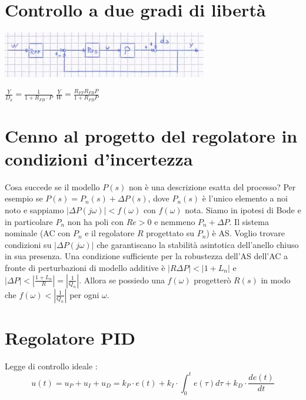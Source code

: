 \begin{landscape}
\begin{multicols*}{2}
    \section{Controllo a due gradi di libertà}
    \begin{center}
        \includegraphics[height=2cm]{../formulario/img5.JPG}
    \end{center}
    $\frac{Y}{D_a} = \frac{1}{1+R_{FB} \cdot P}$\newline
    $\frac{Y}{W} = \frac{R_{FF} R_{FB} P}{1 + R_{FB} P}$
    \section{Cenno al progetto del regolatore in condizioni d'incertezza}
    Cosa succede se il modello $P(s)$ non è una descrizione esatta del processo?\newline
    Per esempio se $P(s) = P_n(s) + \Delta P(s)$, dove $P_n(s)$ è l'unico elemento a noi noto e sappiamo $|\Delta P(j \omega)| < f(\omega)$ con $f(\omega)$ nota. \newline
    Siamo in ipotesi di Bode e in particolare $P_n$ non ha poli con $Re > 0$ e nemmeno $P_n + \Delta P$.\newline
    Il sistema nominale (AC con $P_n$ e il regolatore $R$ progettato su $P_n$) è AS.\newline
    Voglio trovare condizioni su $|\Delta P (j \omega)|$ che garantiscano la stabilità asintotica dell'anello chiuso in sua presenza.\newline
    Una condizione sufficiente per la robustezza dell'AS dell'AC a fronte di perturbazioni di modello additive è $|R \Delta P| < |1 + L_n|$ e $|\Delta P| < | \frac{1 + L_n}{R}| = | \frac{1}{Q_n}|$.\newline
    Allora se possiedo una $f(\omega)$ progetterò $R(s)$ in modo che $f(\omega) < | \frac{1}{Q_n}| $ per ogni $\omega$.
    \newpage\section{Regolatore PID}
    Legge di controllo ideale :
    \[
        u(t) = u_P + u_I + u_D = k_P \cdot e(t) + k_I \cdot \int_{0}^{t}e(\tau)d \tau + k_D \cdot \frac{d e (t)}{dt}
    \]

\end{multicols*}
\end{landscape}
